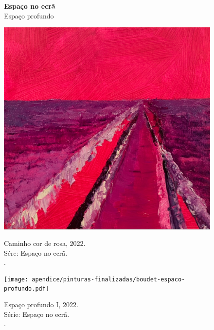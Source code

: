 \begin{figure}
  \caption[Espaço no ecrã: Espaço profundo]{\textbf{Espaço no ecrã} \\ Espaço profundo}
  \begin{minipage}{.45\linewidth}
	\includegraphics[width = \linewidth]{apendice/pinturas-finalizadas/boudet-caminho-cor-de-rosa.pdf}
  \caption*{Caminho cor de rosa, 2022. \\ Sére: Espaço no ecrã. \\ \oleo. \\ }
\end{minipage}\hfill
\begin{minipage}{.45\linewidth}
	\texttt{[image: apendice/pinturas-finalizadas/boudet-espaco-profundo.pdf]}
  \caption*{Espaço profundo I, 2022. \\ Série: Espaço no ecrã. \\ \oleo. \\ }
\end{minipage}
\end{figure}

\vfill

